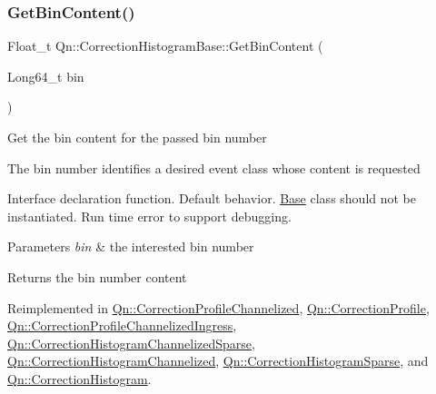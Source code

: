\mbox{\label{classQn_1_1CorrectionHistogramBase_a9e4e745a6f4cbebf5b9277d6d63bc9c7}} 
\subsubsection{\texorpdfstring{Get\+Bin\+Content()}{GetBinContent()}}
{\footnotesize\ttfamily Float\+\_\+t Qn\+::\+Correction\+Histogram\+Base\+::\+Get\+Bin\+Content (\begin{DoxyParamCaption}\item[{Long64\+\_\+t}]{bin }\end{DoxyParamCaption})\hspace{0.3cm}{\ttfamily [virtual]}}

Get the bin content for the passed bin number

The bin number identifies a desired event class whose content is requested

Interface declaration function. Default behavior. \mbox{\hyperlink{classBase}{Base}} class should not be instantiated. Run time error to support debugging.


\begin{DoxyParams}{Parameters}
{\em bin} & the interested bin number \\
\hline
\end{DoxyParams}
\begin{DoxyReturn}{Returns}
the bin number content 
\end{DoxyReturn}


Reimplemented in \mbox{\hyperlink{classQn_1_1CorrectionProfileChannelized_a45d475d580d3c5dfe9d139552eab766b}{Qn\+::\+Correction\+Profile\+Channelized}}, \mbox{\hyperlink{classQn_1_1CorrectionProfile_ad6a10a5dd59ba94e9853699e63d902d4}{Qn\+::\+Correction\+Profile}}, \mbox{\hyperlink{classQn_1_1CorrectionProfileChannelizedIngress_a64fbd6f89e6ddcb0ef22189e868594fa}{Qn\+::\+Correction\+Profile\+Channelized\+Ingress}}, \mbox{\hyperlink{classQn_1_1CorrectionHistogramChannelizedSparse_a247aa9d6cadd6c5373ed4cf0cde8b719}{Qn\+::\+Correction\+Histogram\+Channelized\+Sparse}}, \mbox{\hyperlink{classQn_1_1CorrectionHistogramChannelized_ab398b7a1d5d9a92e183ea164882b4a53}{Qn\+::\+Correction\+Histogram\+Channelized}}, \mbox{\hyperlink{classQn_1_1CorrectionHistogramSparse_a43954a12a3f97e20a1934f18ec4edecd}{Qn\+::\+Correction\+Histogram\+Sparse}}, and \mbox{\hyperlink{classQn_1_1CorrectionHistogram_a469c7ca13b740d1224dcaf5c9a41eb2b}{Qn\+::\+Correction\+Histogram}}.

